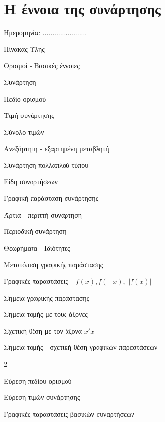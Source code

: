 \documentclass[twoside,nofonts,internet,math,spyros]{frontisthrio}
\newcommand{\myitem}{\stepcounter{enumi}\item[\raisebox{0.5mm}{\faEdit}\ \Large$\square$]}
\begin{document}
\section{Η έννοια της συνάρτησης}
\begin{flushright}
\faCalendar* Ημερομηνία: .......................
\end{flushright}
\begin{mybox}[mysubtitle]{Πίνακας Ύλης}
\begin{tcbraster}[raster columns=2,raster equal height]
\begin{myleftbox}{Ορισμοί - Βασικές έννοιες\ \ \faBook}
\begin{arithmisi}[itemsep=0mm]
\item Συνάρτηση
\item Πεδίο ορισμού
\item Τιμή συνάρτησης
\item Σύνολο τιμών
\item Ανεξάρτητη - εξαρτημένη μεταβλητή
\item Συνάρτηση πολλαπλού τύπου
\item Είδη συναρτήσεων
\item Γραφική παράσταση συνάρτησης
\item Άρτια - περιττή συνάρτηση
\item Περιοδική συνάρτηση
\end{arithmisi}
\end{myleftbox}
\begin{myrightbox}{Θεωρήματα - Ιδιότητες\ \ \faTools}
\begin{arithmisi}[itemsep=0mm]
\item Μετατόπιση γραφικής παράστασης
\item Γραφικές παραστάσεις $ -f(x), f(-x),$ $|f(x)| $
\item Σημεία γραφικής παράστασης
\item Σημεία τομής με τους άξονες
\item Σχετική θέση με τον άξονα $ x'x $
\item Σημεία τομής - σχετική θέση γραφικών παραστάσεων
\end{arithmisi}
\end{myrightbox}
\end{tcbraster}
\begin{multicols}{2}
\begin{todolist}[itemsep=0mm]
\myitem Εύρεση πεδίου ορισμού
\myitem Εύρεση τιμών συνάρτησης
\item Γραφικές παραστάσεις βασικών συναρτήσεων

\end{todolist}
\end{multicols}
\end{mybox}
\end{document}
